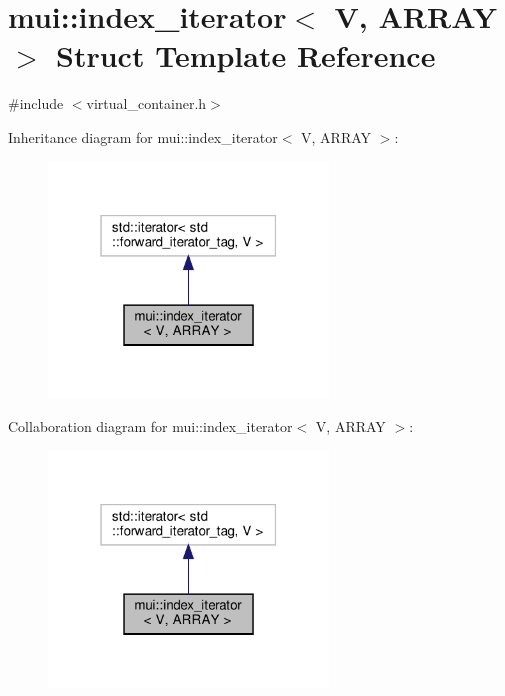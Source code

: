 \hypertarget{structmui_1_1index__iterator}{}\section{mui\+:\+:index\+\_\+iterator$<$ V, A\+R\+R\+AY $>$ Struct Template Reference}
\label{structmui_1_1index__iterator}


{\ttfamily \#include $<$virtual\+\_\+container.\+h$>$}



Inheritance diagram for mui\+:\+:index\+\_\+iterator$<$ V, A\+R\+R\+AY $>$\+:
\nopagebreak
\begin{figure}[H]
\begin{center}
\leavevmode
\includegraphics[width=211pt]{structmui_1_1index__iterator__inherit__graph}
\end{center}
\end{figure}


Collaboration diagram for mui\+:\+:index\+\_\+iterator$<$ V, A\+R\+R\+AY $>$\+:
\nopagebreak
\begin{figure}[H]
\begin{center}
\leavevmode
\includegraphics[width=211pt]{structmui_1_1index__iterator__coll__graph}
\end{center}
\end{figure}
